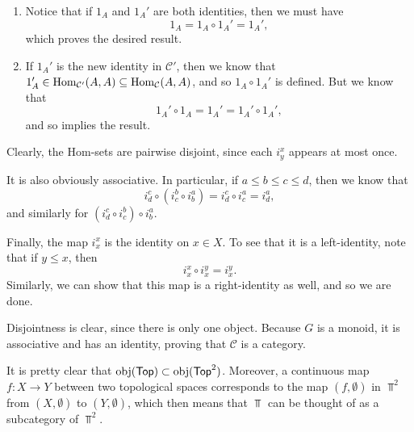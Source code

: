 \documentclass[../../solutions.tex]{subfiles}
\begin{document}
\begin{exercise} \leavevmode 
\begin{enumerate} 
\item Notice that if $1_A$ and $1_A'$ are both identities, then we must have \[1_A=1_A\circ 1_A'=1_A',\] which proves the desired result. 

\item If $1_A'$ is the new identity in $\mathcal C'$, then we know that $1_A'\in\operatorname{Hom}_{\mathcal C'}(A,A)\subseteq\operatorname{Hom}_{\mathcal C}(A,A)$, and so $1_A\circ 1_A'$ is defined. But we know that \[1_A'\circ1_A=1_A'=1_A'\circ1_A',\] and so  implies the result. 
\end{enumerate} 
\end{exercise} 

\begin{exercise} \leavevmode
Clearly, the Hom-sets are pairwise disjoint, since each $i^x_y$ appears at most once. 

It is also obviously associative. In particular, if $a\le b\le c\le d$, then we know that \[i^c_d\circ\left(i^b_c\circ i^a_b\right)=i^c_d\circ i^a_c=i^a_d,\] and similarly for $\left(i^c_d\circ i^b_c\right)\circ i^a_b$. 

Finally, the map $i^x_x$ is the identity on $x\in X$. To see that it is a left-identity, note that if $y\le x$, then \[i_x^x\circ i_x^y=i_x^y.\] Similarly, we can show that this map is a right-identity as well, and so we are done. 
\end{exercise} 

\begin{exercise} \leavevmode
Disjointness is clear, since there is only one object. Because $G$ is a monoid, it is associative and has an identity, proving that $\mathcal C$ is a category. 
\end{exercise} 

\begin{exercise} \leavevmode
It is pretty clear that $\operatorname{obj}(\mathsf{Top})\subset\operatorname{obj}(\mathsf{Top}^2)$. Moreover, a continuous map $f:X\to Y$ between two topological spaces corresponds to the map $(f,\emptyset)$ in $\Top^2$ from $(X,\emptyset)$ to $(Y,\emptyset)$, which then means that $\Top$ can be thought of as a subcategory of $\Top^2$. 
\end{exercise} 
\end{document}
